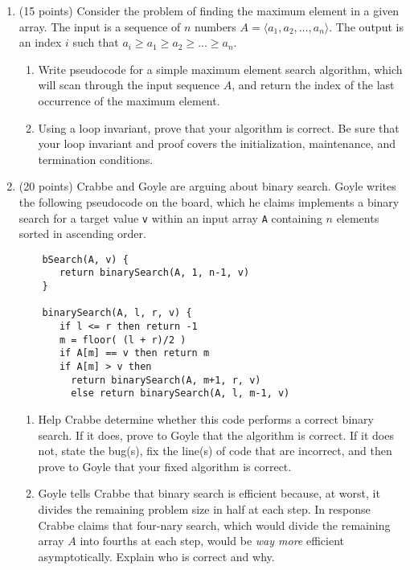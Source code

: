\documentclass[12pt]{article}
\begin{document}
\begin{enumerate}
 	\item (15 points) Consider the problem of finding the maximum element in a given array. The input is a sequence of $n$ numbers $A=\langle a_{1},a_{2},\dots,a_{n}\rangle$. The output is an index $i$ such that $a_{i} \geq a_{1} \geq a_{2} \geq ... \geq a_{n}$.
	
 	\begin{enumerate}
 	\item Write pseudocode for a simple maximum element search algorithm, which will scan through the input sequence $A$, and return the index of the last occurrence of the maximum element.
 	\item Using a loop invariant, prove that your algorithm is correct. Be sure that your loop invariant and proof covers the initialization, maintenance, and termination conditions.
 	\end{enumerate}
	
	\newpage
	
	\item (20 points) Crabbe and Goyle are arguing about binary search. Goyle writes the following pseudocode on the board, which he claims implements a binary search for a target value {\tt v} within an input array {\tt A} containing $n$ elements sorted in ascending order.
	\begin{small}
	\begin{verbatim}
	bSearch(A, v) {
	   return binarySearch(A, 1, n-1, v)
	}
	
	binarySearch(A, l, r, v) {
	   if l <= r then return -1
	   m = floor( (l + r)/2 )
	   if A[m] == v then return m
	   if A[m] > v then
	     return binarySearch(A, m+1, r, v)
	     else return binarySearch(A, l, m-1, v)
	\end{verbatim}
	\end{small}
	
	\begin{enumerate}
	\item Help Crabbe determine whether this code performs a correct binary search. If it does, prove to Goyle that the algorithm is correct. If it does not, state the bug(s), fix the line(s) of code that are incorrect, and then prove to Goyle that your fixed algorithm is correct.
	\item Goyle tells Crabbe that binary search is efficient because, at worst, it divides the remaining problem size in half at each step. In response Crabbe claims that four-nary search, which would divide the remaining array $A$ into fourths at each step, would be \textit{way more} efficient asymptotically. Explain who is correct and why.
	\end{enumerate}

\end{enumerate}
\end{document}
